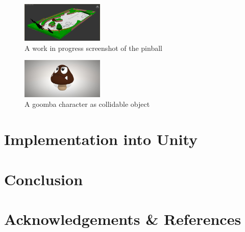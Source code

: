 \documentclass[11.5pt,oneside,a4paper]{scrartcl}
\newcounter{ct}
\begin{document}
\begin{figure}
	\centering
	\includegraphics[width=0.35\textwidth]{pinballinprogress.jpg}
	\caption{A work in progress screenshot of the pinball}
	\label{fig:pinballinprogress}
	\vspace{0.6cm}
\end{figure}

\begin{figure}
	\centering
	\includegraphics[width=0.35\textwidth]{goomba.jpg}
	\caption{A goomba character as collidable object}
	\label{fig:goomba}
	\vspace{0.6cm}
\end{figure}

\section{Implementation into Unity}

\section{Conclusion}

\section{Acknowledgements \& References}
\end{document}

